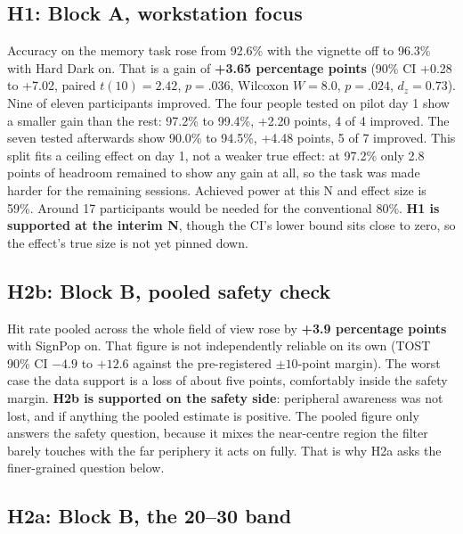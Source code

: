 \subsection{H1: Block A, workstation focus}

Accuracy on the memory task rose from 92.6\% with the vignette off to 96.3\% with Hard Dark on. That
is a gain of \textbf{+3.65 percentage points} (90\% CI +0.28 to +7.02, paired $t(10) = 2.42$,
$p = .036$, Wilcoxon $W = 8.0$, $p = .024$, $d_z = 0.73$). Nine of eleven participants improved. The
four people tested on pilot day 1 show a smaller gain than the rest: 97.2\% to 99.4\%, +2.20 points,
4 of 4 improved. The seven tested afterwards show 90.0\% to 94.5\%, +4.48 points, 5 of 7 improved.
This split fits a ceiling effect on day 1, not a weaker true effect: at 97.2\% only 2.8 points of
headroom remained to show any gain at all, so the task was made harder for the remaining sessions.
Achieved power at this N and effect size is 59\%. Around 17 participants would be needed for the
conventional 80\%. \textbf{H1 is supported at the interim N}, though the CI's lower bound sits close
to zero, so the effect's true size is not yet pinned down.

\subsection{H2b: Block B, pooled safety check}

Hit rate pooled across the whole field of view rose by \textbf{+3.9 percentage points} with SignPop
on. That figure is not independently reliable on its own (TOST 90\% CI $-4.9$ to $+12.6$ against the
pre-registered $\pm 10$-point margin). The worst case the data support is a loss of about five points,
comfortably inside the safety margin. \textbf{H2b is supported on the safety side}: peripheral
awareness was not lost, and if anything the pooled estimate is positive. The pooled figure only
answers the safety question, because it mixes the near-centre region the filter barely touches with
the far periphery it acts on fully. That is why H2a asks the finer-grained question below.

\subsection{H2a: Block B, the 20–30\textdegree{} band}

